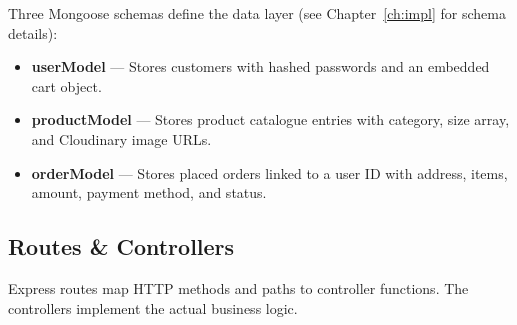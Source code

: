 \documentclass[12pt,a4paper]{report}
\begin{document}
Three Mongoose schemas define the data layer (see Chapter~\ref{ch:impl} for schema details):

\begin{itemize}[leftmargin=*]
  \item \textbf{userModel} — Stores customers with hashed passwords and an embedded cart object.
  \item \textbf{productModel} — Stores product catalogue entries with category, size array, and
        Cloudinary image URLs.
  \item \textbf{orderModel} — Stores placed orders linked to a user ID with address, items, amount,
        payment method, and status.
\end{itemize}

\subsection{Routes \& Controllers}

Express routes map HTTP methods and paths to controller functions.
The controllers implement the actual business logic.
\end{document}
